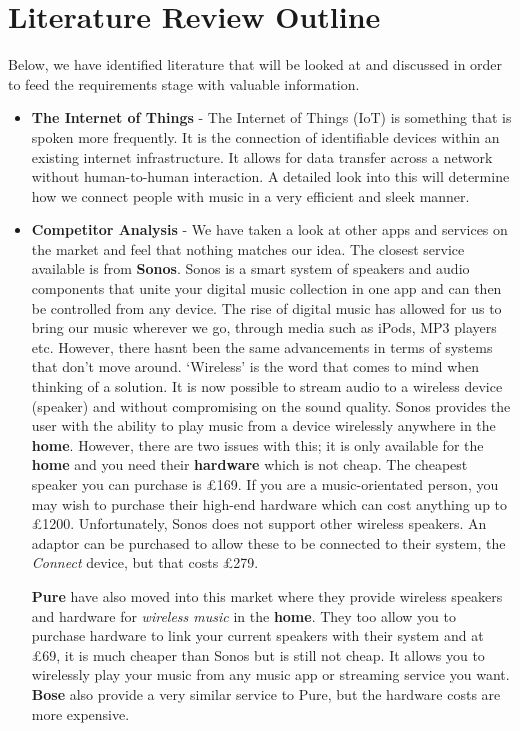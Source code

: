 \section{Literature Review Outline}

Below, we have identified literature that will be looked at and discussed in order to feed the requirements stage with valuable information.
\begin{itemize}
  \item \textbf{The Internet of Things} - 
    The Internet of Things (IoT) is something that is spoken more frequently. It is the connection of identifiable devices within an existing internet infrastructure. It allows for data transfer across a network without human-to-human interaction. A detailed look into this will determine how we connect people with music in a very efficient and sleek manner.
  \item \textbf{Competitor Analysis} - 
    We have taken a look at other apps and services on the market and feel that nothing matches our idea. The closest service available is from \textbf{Sonos}. Sonos is a smart system of speakers and audio components that unite your digital music collection in one app and can then be controlled from any device. The rise of digital music has allowed for us to bring our music wherever we go, through media such as iPods, MP3 players etc. However, there hasnt been the same advancements in terms of systems that don't move around. `Wireless' is the word that comes to mind when thinking of a solution. It is now possible to stream audio to a wireless device (speaker) and without compromising on the sound quality. Sonos provides the user with the ability to play music from a device wirelessly anywhere in the \textbf{home}. However, there are two issues with this; it is only available for the \textbf{home} and you need their \textbf{hardware} which is not cheap. The cheapest speaker you can purchase is \pounds169. If you are a music-orientated person, you may wish to purchase their high-end hardware which can cost anything up to \pounds1200. Unfortunately, Sonos does not support other wireless speakers. An adaptor can be purchased to allow these to be connected to their system, the \emph{Connect} device, but that costs \pounds279.  

    \textbf{Pure} have also moved into this market where they provide wireless speakers and hardware for \emph{wireless music} in the \textbf{home}. They too allow you to purchase hardware to link your current speakers with their system and at \pounds69, it is much cheaper than Sonos but is still not cheap. It allows you to wirelessly play your music from any music app or streaming service you want. \textbf{Bose} also provide a very similar service to Pure, but the hardware costs are more expensive.


\end{itemize}
